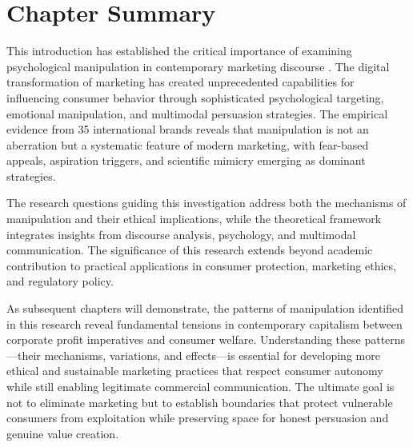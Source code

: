 \section{Chapter Summary}
\label{sec:chapter_summary}

This introduction has established the critical importance of examining psychological manipulation in contemporary marketing discourse \cite{fairclough2015language}. The digital transformation of marketing has created unprecedented capabilities for influencing consumer behavior through sophisticated psychological targeting, emotional manipulation, and multimodal persuasion strategies. The empirical evidence from 35 international brands reveals that manipulation is not an aberration but a systematic feature of modern marketing, with fear-based appeals, aspiration triggers, and scientific mimicry emerging as dominant strategies.

The research questions guiding this investigation address both the mechanisms of manipulation and their ethical implications, while the theoretical framework integrates insights from discourse analysis, psychology, and multimodal communication. The significance of this research extends beyond academic contribution to practical applications in consumer protection, marketing ethics, and regulatory policy.

As subsequent chapters will demonstrate, the patterns of manipulation identified in this research reveal fundamental tensions in contemporary capitalism between corporate profit imperatives and consumer welfare. Understanding these patterns—their mechanisms, variations, and effects—is essential for developing more ethical and sustainable marketing practices that respect consumer autonomy while still enabling legitimate commercial communication. The ultimate goal is not to eliminate marketing but to establish boundaries that protect vulnerable consumers from exploitation while preserving space for honest persuasion and genuine value creation.